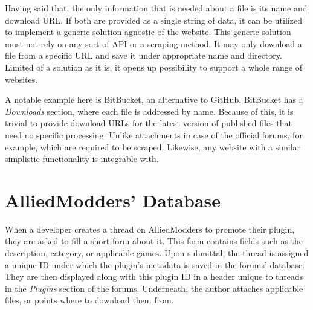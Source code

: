 Having said that, the only information that is needed about a file is its name and download URL.
If both are provided as a single string of data, it can be utilized to implement a generic solution agnostic of the website.
This generic solution must not rely on any sort of API or a scraping method.
It may only download a file from a specific URL and save it under appropriate name and directory.
Limited of a solution as it is, it opens up possibility to support a whole range of websites.

A notable example here is BitBucket, an alternative to GitHub.
BitBucket has a \textit{Downloads} section, where each file is addressed by name.
Because of this, it is trivial to provide download URLs for the latest version of published files that need no specific processing.
Unlike attachments in case of the official forums, for example, which are required to be scraped.
Likewise, any website with a similar simplistic functionality is integrable with.

\section{AlliedModders' Database}

When a developer creates a thread on AlliedModders to promote their plugin, they are asked to fill a short form about it.
This form contains fields such as the description, category, or applicable games.
Upon submittal, the thread is assigned a unique ID under which the plugin's metadata is saved in the forums' database.
They are then displayed along with this plugin ID in a header unique to threads in the \textit{Plugins} section of the forums.
Underneath, the author attaches applicable files, or points where to download them from.

